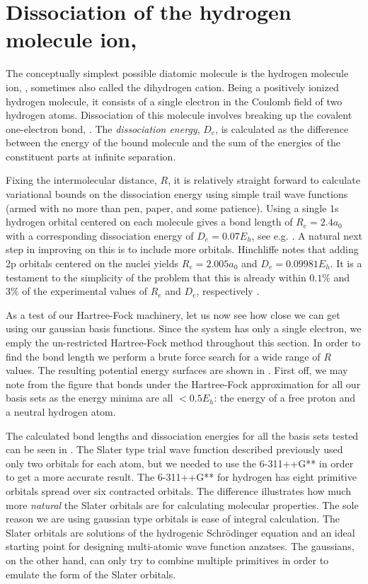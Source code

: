 \documentclass[../../master.tex]{subfiles}
\begin{document}
\section{Dissociation of the hydrogen molecule ion, \texorpdfstring{}{H2+}}
The conceptually simplest possible diatomic molecule is the hydrogen molecule ion, , sometimes also called the dihydrogen cation. Being a positively ionized hydrogen molecule, it consists of a single electron in the Coulomb field of two hydrogen atoms. Dissociation of this molecule involves breaking up the covalent one-electron bond, . The \emph{dissociation energy}, $D_e$, is calculated as the difference between the energy of the bound molecule and the sum of the energies of the constituent parts at infinite separation.

Fixing the intermolecular distance, $R$, it is relatively straight forward to calculate variational bounds on the dissociation energy using simple trail wave functions (armed with no more than pen, paper, and some patience). Using a single 1s hydrogen orbital centered on each molecule gives a bond length of $R_e=2.4a_0$ with a corresponding dissociation energy of $D_e=0.07E_h$, see e.g. \cite{griffiths}. A natural next step in improving on this is to include more orbitals. Hinchliffe notes that adding 2p orbitals centered on the nuclei yields $R_e=2.005a_0$ and $D_e=0.09981E_h$. It is a testament to the simplicity of the problem that this is already within $0.1\%$ and $3\%$ of the experimental values of $R_e$ and $D_e$, respectively \cite{hinchliffe}.

As a test of our Hartree-Fock machinery, let us now see how close we can get using our gaussian basis functions. Since the system has only a single electron, we emply the un-restricted Hartree-Fock method throughout this section. In order to find the bond length we perform a brute force search for a wide range of $R$ values. The resulting potential energy surfaces are shown in . First off, we may note from the figure that  bonds under the Hartree-Fock approximation for all our basis sets as the energy minima are all $<0.5E_h$: the energy of a free proton and a neutral hydrogen atom.

The calculated bond lengths and dissociation energies for all the basis sets tested can be seen in . The Slater type trial wave function described previously used only two orbitals for each atom, but we needed to use the 6-311++G** in order to get a more accurate result. The 6-311++G** for hydrogen has eight primitive orbitals spread over six contracted orbitals. The difference illustrates how much more \emph{natural} the Slater orbitals are for calculating molecular properties. The sole reason we are using gaussian type orbitals is ease of integral calculation. The Slater orbitals are solutions of the hydrogenic Schrödinger equation and an ideal starting point for designing multi-atomic wave function anzatses. The gaussians, on the other hand, can only try to combine multiple primitives in order to emulate the form of the Slater orbitals.
\end{document}
